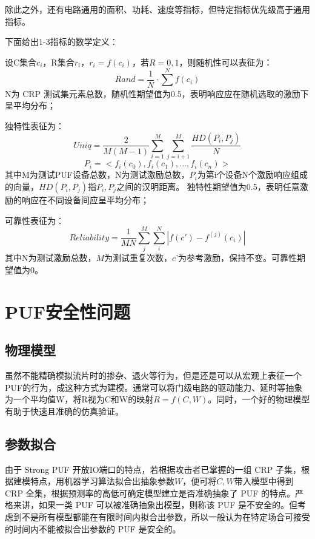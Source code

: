 除此之外，还有电路通用的面积、功耗、速度等指标，但特定指标优先级高于通用指标。

下面给出1-3指标的数学定义：

设C集合$ {c_i} $，R集合$ {r_i} $，$ r_i=f(c_i) $，若$ R={0,1} $，则随机性可以表征为：
\begin{equation}
Rand=\frac{1}{N}\cdot\sum^{N}f(c_i)
\end{equation}
N为 CRP 测试集元素总数，随机性期望值为0.5，表明响应应在随机选取的激励下呈平均分布；

独特性表征为：
\begin{equation}
Uniq=\dfrac{2}{M(M-1)}\sum_{i=1}^{M}\sum_{j=i+1}^{M}\frac{HD(P_i,P_j)}{N}
\end{equation}
\begin{equation}
P_i=<f_i(c_0),f_i(c_1),...,f_i(c_n)>
\end{equation}
其中M为测试PUF设备总数，N为测试激励总数，$ P_i $为第i个设备N个激励响应组成的向量，$ HD(P_i,P_j) $指$ P_i,P_j $之间的汉明距离。
独特性期望值为0.5，表明任意激励的响应在不同设备间应呈平均分布；

可靠性表征为：
\begin{equation}
Reliability=\dfrac{1}{MN}\sum_{j}^{M}\sum_{i}^{N}|f(c')-f^{(j)}(c_i)|
\end{equation}
其中N为测试激励总数，$ M $为测试重复次数，$ c’ $为参考激励，保持不变。可靠性期望值为0。
\section{PUF安全性问题}\label{sec:puf_security}
\subsection{物理模型}
虽然不能精确模拟流片时的掺杂、退火等行为，但是还是可以从宏观上表征一个PUF的行为，成这种方式为建模。通常可以将门级电路的驱动能力、延时等抽象为一个平均值W，将R视为C和W的映射$ R=f(C,W) $。同时，一个好的物理模型有助于快速且准确的仿真验证。
\subsection{参数拟合}
由于 Strong PUF 开放IO端口的特点，若根据攻击者已掌握的一组 CRP 子集，根据建模特点，用机器学习算法拟合出抽象参数$ W $，便可将$ C,W $带入模型中得到 CRP 全集，根据预测率的高低可确定模型建立是否准确抽象了 PUF 的特点。严格来讲，如果一类 PUF 可以被准确抽象出模型，则称该 PUF 是不安全的。但考虑到不是所有模型都能在有限时间内拟合出参数，所以一般认为在特定场合可接受的时间内不能被拟合出参数的 PUF 是安全的。
